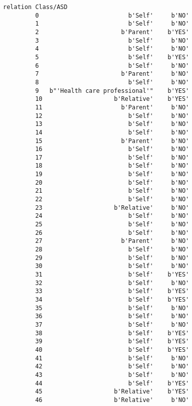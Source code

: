 \documentclass[11pt]{article}
\begin{document}
\begin{Verbatim}[commandchars=\\\{\}]
                                  relation Class/ASD  
         0                         b'Self'     b'NO'  
         1                         b'Self'     b'NO'  
         2                       b'Parent'    b'YES'  
         3                         b'Self'     b'NO'  
         4                         b'Self'     b'NO'  
         5                         b'Self'    b'YES'  
         6                         b'Self'     b'NO'  
         7                       b'Parent'     b'NO'  
         8                         b'Self'     b'NO'  
         9   b"'Health care professional'"    b'YES'  
         10                    b'Relative'    b'YES'  
         11                      b'Parent'     b'NO'  
         12                        b'Self'     b'NO'  
         13                        b'Self'     b'NO'  
         14                        b'Self'     b'NO'  
         15                      b'Parent'     b'NO'  
         16                        b'Self'     b'NO'  
         17                        b'Self'     b'NO'  
         18                        b'Self'     b'NO'  
         19                        b'Self'     b'NO'  
         20                        b'Self'     b'NO'  
         21                        b'Self'     b'NO'  
         22                        b'Self'     b'NO'  
         23                    b'Relative'     b'NO'  
         24                        b'Self'     b'NO'  
         25                        b'Self'     b'NO'  
         26                        b'Self'     b'NO'  
         27                      b'Parent'     b'NO'  
         28                        b'Self'     b'NO'  
         29                        b'Self'     b'NO'  
         30                        b'Self'     b'NO'  
         31                        b'Self'    b'YES'  
         32                        b'Self'     b'NO'  
         33                        b'Self'    b'YES'  
         34                        b'Self'    b'YES'  
         35                        b'Self'     b'NO'  
         36                        b'Self'     b'NO'  
         37                        b'Self'     b'NO'  
         38                        b'Self'    b'YES'  
         39                        b'Self'    b'YES'  
         40                        b'Self'    b'YES'  
         41                        b'Self'     b'NO'  
         42                        b'Self'     b'NO'  
         43                        b'Self'     b'NO'  
         44                        b'Self'    b'YES'  
         45                    b'Relative'    b'YES'  
         46                    b'Relative'     b'NO'  

\end{Verbatim}
\end{document}

